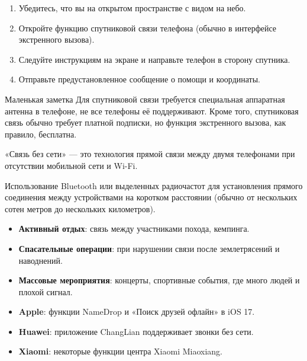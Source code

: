 
\begin{enumerate}
  \item Убедитесь, что вы на открытом пространстве с видом на небо.
  \item Откройте функцию спутниковой связи телефона (обычно в интерфейсе экстренного вызова).
  \item Следуйте инструкциям на экране и направьте телефон в сторону спутника.
  \item Отправьте предустановленное сообщение о помощи и координаты.
\end{enumerate}

\begin{tcbinfo}{Маленькая заметка}
Для спутниковой связи требуется специальная аппаратная антенна в телефоне, не все телефоны её поддерживают. Кроме того, спутниковая связь обычно требует платной подписки, но функция экстренного вызова, как правило, бесплатна.

\end{tcbinfo}


«Связь без сети» — это технология прямой связи между двумя телефонами при отсутствии мобильной сети и Wi-Fi.


Использование Bluetooth или выделенных радиочастот для установления прямого соединения между устройствами на коротком расстоянии (обычно от нескольких сотен метров до нескольких километров).


\begin{itemize}
  \item \textbf{Активный отдых}: связь между участниками похода, кемпинга.
  \item \textbf{Спасательные операции}: при нарушении связи после землетрясений и наводнений.
  \item \textbf{Массовые мероприятия}: концерты, спортивные события, где много людей и плохой сигнал.
\end{itemize}


\begin{itemize}
  \item \textbf{Apple}: функции NameDrop и «Поиск друзей офлайн» в iOS 17.
  \item \textbf{Huawei}: приложение ChangLian поддерживает звонки без сети.
  \item \textbf{Xiaomi}: некоторые функции центра Xiaomi Miaoxiang.
\end{itemize}

